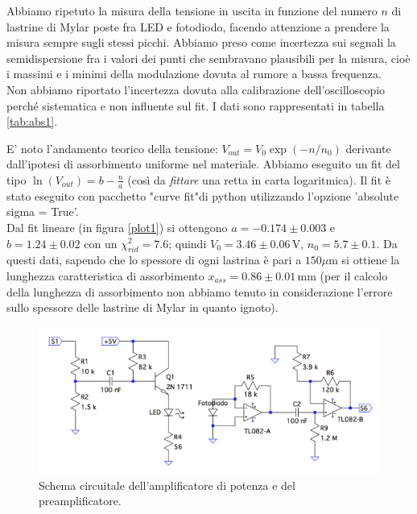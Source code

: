 \documentclass[10pt,a4paper]{article}
\begin{document}
Abbiamo ripetuto la misura della tensione in uscita in funzione del numero $n$ di lastrine di Mylar poste fra LED e fotodiodo, facendo attenzione a prendere   la misura sempre sugli stessi picchi. 
Abbiamo preso come incertezza sui segnali la semidispersione fra i valori dei punti che sembravano plausibili per la misura, cioè i massimi e i minimi della modulazione dovuta al rumore a bassa frequenza.\\
Non abbiamo riportato l'incertezza dovuta alla  calibrazione dell'oscilloscopio perché sistematica e non influente sul fit. I dati sono rappresentati in tabella \ref{tab:abs1}. 

E' noto l'andamento teorico della tensione: $V_{out}=V_0 \exp(-n/n_0)$ derivante dall'ipotesi di assorbimento uniforme nel materiale. Abbiamo eseguito un fit del tipo $\ln(V_{out})=b-\frac{n}{a}$ (così da \emph{fittare} una retta in carta logaritmica). Il fit è stato eseguito con pacchetto "curve fit"di python utilizzando l'opzione 'absolute sigma = True'. \\ %
Dal fit lineare (in figura \ref{plot1}) si ottengono $a=-0.174\pm0.003$ e $b=1.24\pm0.02$ con un $\chi^2_{rid}=7.6$; quindi $V_0= 3.46\pm0.06\,\mbox{V}$, $n_0=5.7\pm0.1$. Da questi dati, sapendo che lo spessore di ogni lastrina è pari a $150\mu \mbox{m}$ si ottiene la lunghezza caratteristica di assorbimento $x_{ass}=0.86\pm0.01\,\mbox{mm}$ (per il calcolo della lunghezza di assorbimento non abbiamo tenuto in considerazione l'errore sullo spessore delle lastrine di Mylar in quanto ignoto).


\begin{figure}[!htb]
  \centering
  \includegraphics[scale=0.75]{ampli-preampli.png}
\caption{Schema circuitale dell'amplificatore di potenza e del preamplificatore.\label{fig:ampli-preampli}}
\end{figure}
\end{document}
